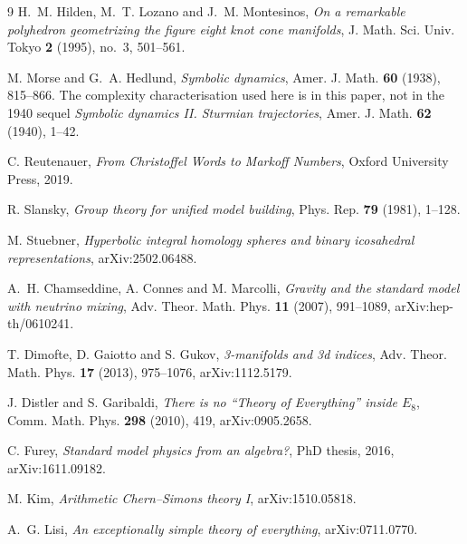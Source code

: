 \documentclass[11pt,reqno]{amsart}
\theoremstyle{plain}
\theoremstyle{definition}
\theoremstyle{remark}
\begin{document}
\begin{thebibliography}{9}
 H.~M. Hilden, M.~T. Lozano and J.~M. Montesinos, \emph{On a remarkable
polyhedron geometrizing the figure eight knot cone manifolds}, J. Math. Sci. Univ.
Tokyo \textbf{2} (1995), no.~3, 501--561.

 M. Morse and G.~A. Hedlund, \emph{Symbolic dynamics},
  Amer. J. Math. \textbf{60} (1938), 815--866. The complexity characterisation used here
  is in this paper, not in the 1940 sequel \emph{Symbolic dynamics II. Sturmian
  trajectories}, Amer. J. Math. \textbf{62} (1940), 1--42.

 C. Reutenauer, \emph{From Christoffel Words to Markoff Numbers},
Oxford University Press, 2019.

 R. Slansky, \emph{Group theory for unified model building}, Phys. Rep.
\textbf{79} (1981), 1--128.

 M. Stuebner, \emph{Hyperbolic integral homology spheres and binary
icosahedral representations}, arXiv:2502.06488.

 A.~H. Chamseddine, A. Connes and M. Marcolli, \emph{Gravity and the standard
model with neutrino mixing}, Adv. Theor. Math. Phys. \textbf{11} (2007), 991--1089,
arXiv:hep-th/0610241.

 T. Dimofte, D. Gaiotto and S. Gukov, \emph{3-manifolds and 3d indices},
Adv. Theor. Math. Phys. \textbf{17} (2013), 975--1076, arXiv:1112.5179.

 J. Distler and S. Garibaldi, \emph{There is no ``Theory of
Everything'' inside $E_8$}, Comm. Math. Phys. \textbf{298} (2010), 419, arXiv:0905.2658.

 C. Furey, \emph{Standard model physics from an algebra?}, PhD thesis, 2016,
arXiv:1611.09182.

 M. Kim, \emph{Arithmetic Chern--Simons theory I}, arXiv:1510.05818.

 A.~G. Lisi, \emph{An exceptionally simple theory of everything},
arXiv:0711.0770.

\end{thebibliography}
\end{document}
